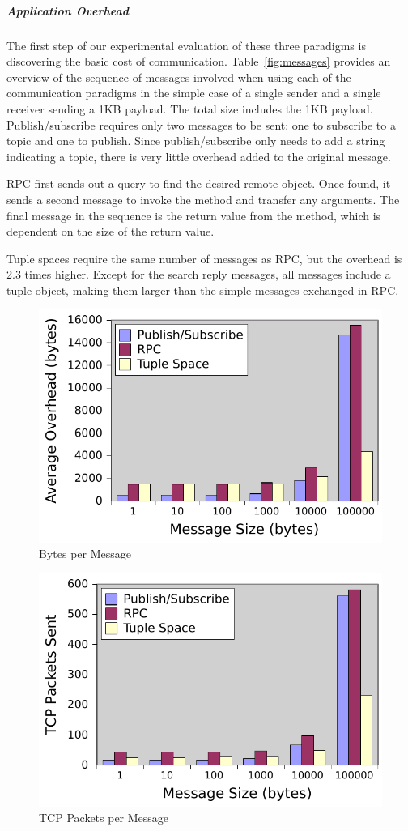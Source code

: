 \subparagraph{Application Overhead}\label{sec:app_overhead}

The first step of our experimental evaluation of these three paradigms is discovering the basic cost of communication. Table~\ref{fig:messages} provides an overview of the sequence of messages involved when using each of the communication paradigms in the simple case of a single sender and a single receiver sending a 1KB payload. The total size includes the 1KB payload.
Publish/subscribe requires only two messages to be sent: one to subscribe to a topic and one to publish. Since publish/subscribe only needs to add a string indicating a topic, there is very little overhead added to the original message.

RPC first sends out a query to find the desired remote object. Once found, it sends a second message to invoke the method and transfer any arguments. The final message in the sequence is the return value from the method, which is dependent on the size of the return value.


Tuple spaces require the same number of messages as RPC, but the overhead is 2.3 times higher. Except for the search reply messages, all messages include a tuple object, making them larger than the simple messages exchanged in RPC.


\begin{figure}
\centering
\includegraphics[width = .48\textwidth]{figures/message-overhead-bytes.pdf}
\caption{Bytes per Message}
\label{fig:overhead-bytes}
\end{figure}

\begin{figure}
\centering
\includegraphics[width = .48\textwidth]{figures/message-overhead-packets.pdf}
\caption{TCP Packets per Message}
\label{fig:overhead-packets}
\end{figure}

